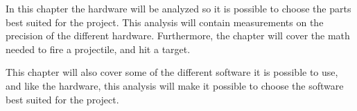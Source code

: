 In this chapter the hardware will be analyzed so it is possible to choose the parts best suited for the project. This analysis will contain measurements on the precision of the different hardware. Furthermore, the chapter will cover the math needed to fire a projectile, and hit a target.

This chapter will also cover some of the different software it is possible to use, and like the hardware, this analysis will make it possible to choose the software best suited for the project.